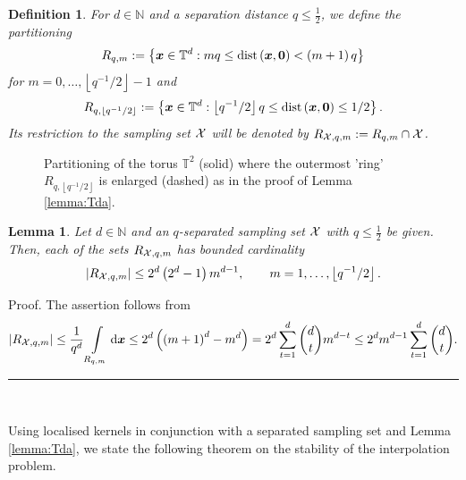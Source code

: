 \documentclass[11pt,a4paper,bibtotoc]{scrartcl}
\def\N{\mathbb{N}}
\def\T{\mathbb{T}}
\newcommand{\zb}[1]{\ensuremath{\boldsymbol{#1}}}
\newcommand{\dist}{{\rm dist}}
\renewcommand{\d}{{\rm d}}
\newcommand{\Boxgl}{\par\vspace{-5ex} \hspace*{0ex} \hfill
  \rule{1.5ex}{1.5ex} \\ \goodbreak\goodbreak}
\newtheorem{lemma}[theorem]{Lemma}
\newtheorem{definition}[theorem]{Definition}
\newenvironment{Lemma}{\goodbreak \begin{lemma}\sl}{\end{lemma}}
\newenvironment{Definition}{\goodbreak \begin{definition}\rm}{\end{definition}}
\numberwithin{equation}{section}
\numberwithin{table}{section}
\numberwithin{figure}{section}
\begin{document}
\begin{Definition}\label{def:part}
  For $d\in\N$ and a separation distance $q \le \frac{1}{2}$, we define the
  partitioning
  \begin{equation*}
    R_{q,m}:=
    \left\{\zb x \in \T^d:m q \le \dist\left(\zb x,\zb
    0\right)<\left(m+1\right)q\right\}
  \end{equation*}
  for $m=0,\hdots,\left\lfloor q^{-1}/2 \right\rfloor-1$ and
  \begin{equation*}
    R_{q,\left\lfloor q^{-1}/2 \right\rfloor}:=
    \left\{\zb x \in \T^d: \left\lfloor q^{-1}/2 \right\rfloor q \le
    \dist\left(\zb x,\zb 0\right)\le 1/2\right\}.
  \end{equation*}
  Its restriction to the sampling set ${\cal X}$ will be denoted by $R_{{\cal
      X},q,m}:=R_{q,m}\cap {\cal X}$.
\end{Definition}

\begin{figure}[ht!]
  \begin{center}
    
  \end{center}
  \caption{Partitioning of the torus $\mathbb{T}^2$ (solid) where the
      outermost 'ring' $R_{q,\left\lfloor q^{-1}/2 \right\rfloor}$ is enlarged
      (dashed) as in the proof of Lemma \ref{lemma:Tda}.\label{fig:Td}}
\end{figure}

\begin{Lemma} \label{lemma:Tda}
   Let $d\in \N$ and an $q$-separated sampling set ${\cal X}$ with $q \le
   \frac{1}{2}$ be given.
   Then, each of the sets $R_{{\cal X},q,m}$ has bounded cardinality
   \begin{equation*}
     \left|R_{{\cal X},q,m}\right|\le 2^d\left(2^d-1\right) m^{d-1},
     \qquad m=1,\hdots,\left\lfloor q^{-1}/2 \right\rfloor.
   \end{equation*}
\end{Lemma}
Proof. The assertion follows from
\begin{equation*}
  \left|R_{{\cal X},q,m}\right| \le \frac{1}{q^d}
  \int\limits_{R_{q,m} } \d \zb x \le
  2^d\left(\left(m+1\right)^d-m^d\right)
  =2^d\sum_{t=1}^d {d\choose t} m^{d-t}
  \le 2^d m^{d-1} \sum_{t=1}^d {d\choose t}.
\end{equation*}
\Boxgl

Using localised kernels in conjunction with a separated sampling set and Lemma
\ref{lemma:Tda}, we state the following theorem on the stability of the
interpolation problem.
\end{document}
